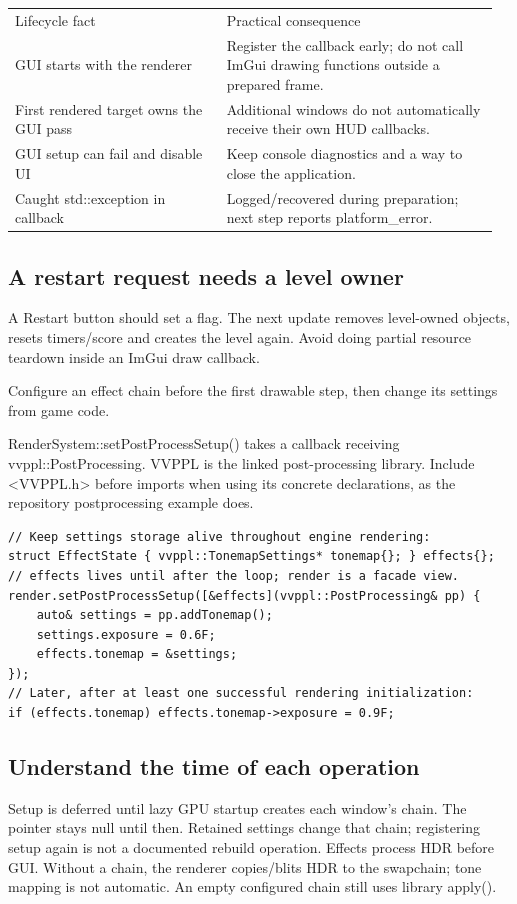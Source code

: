 \documentclass[11pt,a4paper]{article}
\begin{document}
{\small
\begin{longtable}{@{}p{0.42\linewidth}p{0.54\linewidth}@{}}
Lifecycle fact & Practical consequence \\
GUI starts with the renderer & Register the callback early; do not call ImGui drawing functions outside a prepared frame. \\
First rendered target owns the GUI pass & Additional windows do not automatically receive their own HUD callbacks. \\
GUI setup can fail and disable UI & Keep console diagnostics and a way to close the application. \\
Caught std::exception in callback & Logged/recovered during preparation; next step reports platform\_error. \\
\end{longtable}
}

\subsection*{A restart request needs a level owner}
A Restart button should set a flag. The next update removes level-owned objects, resets timers/score and creates the level again. Avoid doing partial resource teardown inside an ImGui draw callback.

\label{core-69}
Configure an effect chain before the first drawable step, then change its settings from game code.

RenderSystem::setPostProcessSetup() takes a callback receiving vvppl::PostProcessing. VVPPL is the linked post-processing library. Include <VVPPL.h> before imports when using its concrete declarations, as the repository postprocessing example does.

\begin{lstlisting}[language={}]
// Keep settings storage alive throughout engine rendering:
struct EffectState { vvppl::TonemapSettings* tonemap{}; } effects{};
// effects lives until after the loop; render is a facade view.
render.setPostProcessSetup([&effects](vvppl::PostProcessing& pp) {
    auto& settings = pp.addTonemap();
    settings.exposure = 0.6F;
    effects.tonemap = &settings;
});
// Later, after at least one successful rendering initialization:
if (effects.tonemap) effects.tonemap->exposure = 0.9F;
\end{lstlisting}

\subsection*{Understand the time of each operation}
Setup is deferred until lazy GPU startup creates each window's chain. The pointer stays null until then. Retained settings change that chain; registering setup again is not a documented rebuild operation. Effects process HDR before GUI. Without a chain, the renderer copies/blits HDR to the swapchain; tone mapping is not automatic. An empty configured chain still uses library apply().
\end{document}
